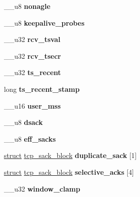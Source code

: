 \begin{DoxyCompactItemize}
\+\_\+\+\_\+u8 {\bfseries nonagle}
\item 
\mbox{\label{structtcp__opt_ae6f8798ba06f7b83e7b32fe0e0f16722}} 
\+\_\+\+\_\+u8 {\bfseries keepalive\+\_\+probes}
\item 
\mbox{\label{structtcp__opt_a481439257d78133dc97076ddc88f8fd2}} 
\+\_\+\+\_\+u32 {\bfseries rcv\+\_\+tsval}
\item 
\mbox{\label{structtcp__opt_a1defc0a0e1cabff947a1ff6339ae88f7}} 
\+\_\+\+\_\+u32 {\bfseries rcv\+\_\+tsecr}
\item 
\mbox{\label{structtcp__opt_a5dc00622fa7c5595cd582c9f38513022}} 
\+\_\+\+\_\+u32 {\bfseries ts\+\_\+recent}
\item 
\mbox{\label{structtcp__opt_a6e82afd594622ad346275a17e6d395d4}} 
long {\bfseries ts\+\_\+recent\+\_\+stamp}
\item 
\mbox{\label{structtcp__opt_acca5b35b48c8e693b3f0e1c1e1f16569}} 
\+\_\+\+\_\+u16 {\bfseries user\+\_\+mss}
\item 
\mbox{\label{structtcp__opt_a5f7327617d83369a6a6e87d959f7b19b}} 
\+\_\+\+\_\+u8 {\bfseries dsack}
\item 
\mbox{\label{structtcp__opt_a66770a8d5b9db0420c61782869aca14c}} 
\+\_\+\+\_\+u8 {\bfseries eff\+\_\+sacks}
\item 
\mbox{\label{structtcp__opt_a73efe6a0a2d3e49ff4b6e06747ecfadd}} 
\hyperlink{interfacestruct}{struct} \hyperlink{structtcp__sack__block}{tcp\+\_\+sack\+\_\+block} {\bfseries duplicate\+\_\+sack} \mbox{[}1\mbox{]}
\item 
\mbox{\label{structtcp__opt_ab4faabe8df698278730fd2271e5d8268}} 
\hyperlink{interfacestruct}{struct} \hyperlink{structtcp__sack__block}{tcp\+\_\+sack\+\_\+block} {\bfseries selective\+\_\+acks} \mbox{[}4\mbox{]}
\item 
\mbox{\label{structtcp__opt_add7dc030eca69e3186f3ecefb3db5f12}} 
\+\_\+\+\_\+u32 {\bfseries window\+\_\+clamp}

\end{DoxyCompactItemize}
